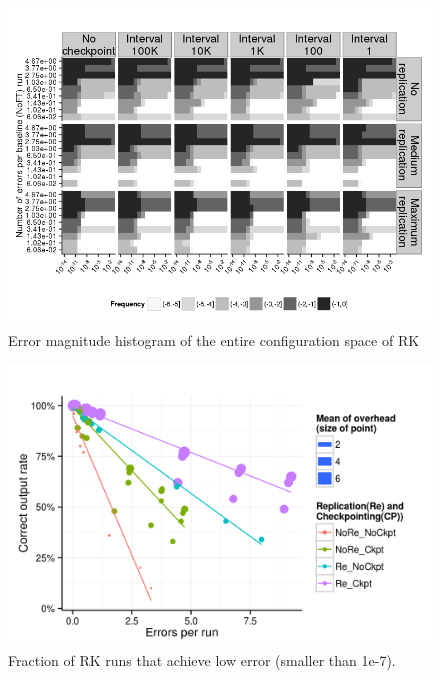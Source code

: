 \documentclass{sig-alternate}
\begin{document}
{\begin{figure}[ht!]
\centering
\includegraphics[width=1.00\columnwidth]{figs/4_1_1_Exp2_2_Heatmap_Error_ConfSpace_RK4.png}
\caption{Error magnitude histogram of the entire configuration space of RK}
\label{fig:rt_algo_err_heatmap}
\end{figure}

\begin{figure}[ht!]
\centering
\includegraphics[width=1.00\columnwidth]{figs/4_1_2_Exp2_Effectiveness.png}
\caption{Fraction of RK runs that achieve low error (smaller than 1e-7).}
\label{fig:rk_effectiveness}
\end{figure}

}
\end{document}
